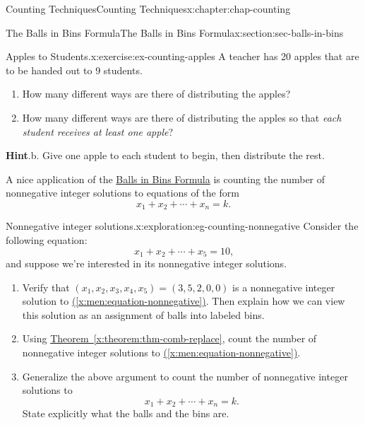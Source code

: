 \documentclass[oneside,10pt,]{book}
\newcommand{\blocktitlefont}{\relax}
\newcommand{\xreffont}{\relax}
\numberwithin{equation}{section}
\begin{document}
\begin{chapterptx}{Counting Techniques}{}{Counting Techniques}{}{}{x:chapter:chap-counting}
\begin{sectionptx}{The Balls in Bins Formula}{}{The Balls in Bins Formula}{}{}{x:section:sec-balls-in-bins}
\begin{inlineexercise}{Apples to Students.}{x:exercise:ex-counting-apples}
A teacher has 20 apples that are to be handed out to 9 students.%
\begin{enumerate}[label=(\alph*)]
\item{}How many different ways are there of distributing the apples?%
\item{}How many different ways are there of distributing the apples so that \emph{each student receives at least one apple}?%
\end{enumerate}
%
\par\smallskip%
\noindent\textbf{\blocktitlefont Hint}.\hypertarget{g:hint:id474706}{}\quad{}b. Give one apple to each student to begin, then distribute the rest.%
\end{inlineexercise}
A nice application of the \hyperref[x:theorem:thm-comb-replace]{Balls in Bins Formula} is counting the number of nonnegative integer solutions to equations of the form%
\begin{equation*}
x_1 + x_2 + \cdots + x_n = k\text{.}
\end{equation*}
%
\begin{exploration}{Nonnegative integer solutions.}{x:exploration:eg-counting-nonnegative}%
Consider the following equation:%
\begin{equation}
x_1 + x_2 + \cdots + x_5 = 10\text{,}\label{x:men:equation-nonnegative}
\end{equation}
and suppose we're interested in its nonnegative integer solutions.%
\begin{enumerate}[font=\bfseries,label=(\alph*),ref=\alph*]
\item{}Verify that \((x_1,x_2,x_3,x_4,x_5) = (3,5,2,0,0)\) is a nonnegative integer solution to \hyperref[x:men:equation-nonnegative]{({\xreffont\ref{x:men:equation-nonnegative}})}. Then explain how we can view this solution as an assignment of balls into labeled bins.%
\item{}Using \hyperref[x:theorem:thm-comb-replace]{Theorem~{\xreffont\ref{x:theorem:thm-comb-replace}}}, count the number of nonnegative integer solutions to \hyperref[x:men:equation-nonnegative]{({\xreffont\ref{x:men:equation-nonnegative}})}.%
\item{}Generalize the above argument to count the number of nonnegative integer solutions to%
\begin{equation*}
x_1 + x_2 + \cdots + x_n = k\text{.}
\end{equation*}
State explicitly what the balls and the bins are.%
\end{enumerate}
\end{exploration}

\end{sectionptx}
\end{chapterptx}
\end{document}
